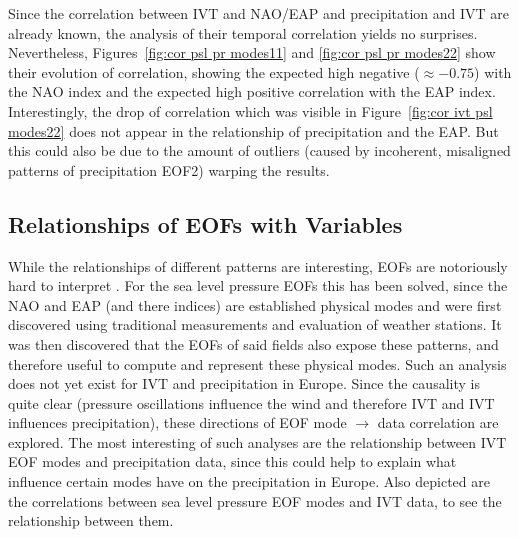 Since the correlation between IVT and NAO/EAP and precipitation and IVT are already known, the analysis of their temporal correlation yields no surprises. 
Nevertheless, Figures~\ref{fig:cor psl pr modes11} and \ref{fig:cor psl pr modes22} show their evolution of correlation, showing the expected high negative ($\approx -0.75$) with the NAO index and the expected high positive correlation with the EAP index. 
Interestingly, the drop of correlation which was visible in Figure~\ref{fig:cor ivt psl modes22} does not appear in the relationship of precipitation and the EAP. 
But this could also be due to the amount of outliers (caused by incoherent, misaligned patterns of precipitation EOF2) warping the results. 




\subsection{Relationships of EOFs with Variables}

While the relationships of different patterns are interesting, EOFs are notoriously hard to interpret \cite{hannachi_empirical_2007, dommenget_cautionary_2002}. 
For the sea level pressure EOFs this has been solved, since the NAO and EAP (and there indices) are established physical modes and were first discovered using traditional measurements and evaluation of weather stations. 
It was then discovered that the EOFs of said fields also expose these patterns, and therefore useful to compute and represent these physical modes.  
Such an analysis does not yet exist for IVT and precipitation in Europe. 
Since the causality is quite clear (pressure oscillations influence the wind and therefore IVT and IVT influences precipitation), these directions of EOF mode $\rightarrow$ data correlation are explored. 
The most interesting of such analyses are the relationship between IVT EOF modes and precipitation data, since this could help to explain what influence certain modes have on the precipitation in Europe. 
Also depicted are the correlations between sea level pressure EOF modes and IVT data, to see the relationship between them. 


